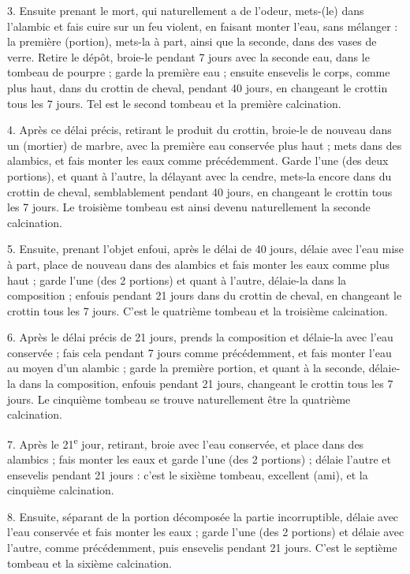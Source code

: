 \documentclass[a4paper, 11pt, oneside, polutonikogreek, french]{article}
\begin{document}
3. Ensuite prenant le mort, qui naturellement a de l'odeur, mets-(le) dans l'alambic et fais cuire sur un feu violent, en faisant monter l'eau, sans mélanger : la première (portion), mets-la à part, ainsi que la seconde, dans des vases de verre. Retire le dépôt, broie-le pendant 7 jours avec la seconde eau, dans le tombeau de pourpre ; garde la première eau ; ensuite ensevelis le corps, comme plus haut, dans du crottin de cheval, pendant 40 jours, en changeant le crottin tous les 7 jours. Tel est le second tombeau et la première calcination.

4. Après ce délai précis, retirant le produit du crottin, broie-le de nouveau dans un (mortier) de marbre, avec la première eau conservée plus haut ; mets dans des alambics, et fais monter les eaux comme précédemment. Garde l'une (des deux portions), et quant à l'autre, la délayant avec la cendre, mets-la encore dans du crottin de cheval, semblablement pendant 40 jours, en changeant le crottin tous les 7 jours. Le troisième tombeau est ainsi devenu naturellement la seconde calcination.

5. Ensuite, prenant l'objet enfoui, après le délai de 40 jours, délaie avec l'eau mise à part, place de nouveau dans des alambics et fais monter les eaux comme plus haut ; garde l'une (des 2 portions) et quant à l'autre, délaie-la dans la composition ; enfouis pendant 21 jours dans du crottin de cheval, en changeant le crottin tous les 7 jours. C'est le quatrième tombeau et la troisième calcination.

6. Après le délai précis de 21 jours, prends la composition et délaie-la avec l'eau conservée ; fais cela pendant 7 jours comme précédemment, et fais monter l'eau au moyen d'un alambic ; garde la première portion, et quant à la seconde, délaie-la dans la composition, enfouis pendant 21 jours, changeant le crottin tous les 7 jours. Le cinquième tombeau se trouve naturellement être la quatrième calcination.

7. Après le 21\textsuperscript{e} jour, retirant, broie avec l'eau conservée, et place dans des alambics ; fais monter les eaux et garde l'une (des 2 portions) ; délaie l'autre et ensevelis pendant 21 jours : c'est le sixième tombeau, excellent (ami), et la cinquième calcination.

8. Ensuite, séparant de la portion décomposée la partie incorruptible, délaie avec l'eau conservée et fais monter les eaux ; garde l'une (des 2 portions) et délaie avec l'autre, comme précédemment, puis ensevelis pendant 21 jours. C'est le septième tombeau et la sixième calcination.
\end{document}
